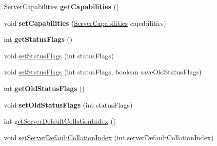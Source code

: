\begin{DoxyCompactItemize}
\item 
\mbox{\label{classcom_1_1mysql_1_1cj_1_1protocol_1_1x_1_1_x_server_session_a71d555b1492164b97f0efe51c235b674}} 
\mbox{\hyperlink{interfacecom_1_1mysql_1_1cj_1_1protocol_1_1_server_capabilities}{Server\+Capabilities}} {\bfseries get\+Capabilities} ()
\item 
\mbox{\label{classcom_1_1mysql_1_1cj_1_1protocol_1_1x_1_1_x_server_session_a17fb384d0559b3b6c12369406c02b68a}} 
void {\bfseries set\+Capabilities} (\mbox{\hyperlink{interfacecom_1_1mysql_1_1cj_1_1protocol_1_1_server_capabilities}{Server\+Capabilities}} capabilities)
\item 
\mbox{\label{classcom_1_1mysql_1_1cj_1_1protocol_1_1x_1_1_x_server_session_a40482eb0bd6517855653665d70e5fd58}} 
int {\bfseries get\+Status\+Flags} ()
\item 
void \mbox{\hyperlink{classcom_1_1mysql_1_1cj_1_1protocol_1_1x_1_1_x_server_session_a30539eae0f7311ac3cd5c9f44c8f7585}{set\+Status\+Flags}} (int status\+Flags)
\item 
void \mbox{\hyperlink{classcom_1_1mysql_1_1cj_1_1protocol_1_1x_1_1_x_server_session_a6b21c9c5c8446643ae85e58c3fe97af8}{set\+Status\+Flags}} (int status\+Flags, boolean save\+Old\+Status\+Flags)
\item 
\mbox{\label{classcom_1_1mysql_1_1cj_1_1protocol_1_1x_1_1_x_server_session_a17dc969e016276c6ccb9ae03ca950da5}} 
int {\bfseries get\+Old\+Status\+Flags} ()
\item 
\mbox{\label{classcom_1_1mysql_1_1cj_1_1protocol_1_1x_1_1_x_server_session_aff18996cbbfff84c6770377bc60d2225}} 
void {\bfseries set\+Old\+Status\+Flags} (int status\+Flags)
\item 
int \mbox{\hyperlink{classcom_1_1mysql_1_1cj_1_1protocol_1_1x_1_1_x_server_session_abbcbd0f1d4c0c4fab564b3ce8083ecf7}{get\+Server\+Default\+Collation\+Index}} ()
\item 
void \mbox{\hyperlink{classcom_1_1mysql_1_1cj_1_1protocol_1_1x_1_1_x_server_session_a2356570d8139fdbd022d253859128cd4}{set\+Server\+Default\+Collation\+Index}} (int server\+Default\+Collation\+Index)

\end{DoxyCompactItemize}
